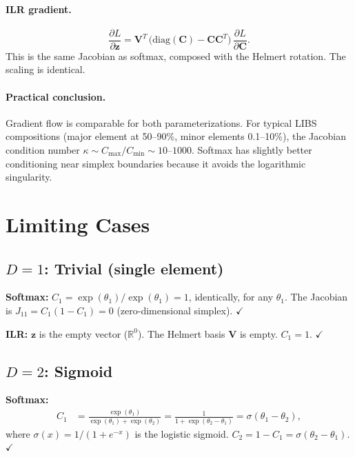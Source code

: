 \documentclass[11pt]{article}
\newcommand{\CC}{\mathbf{C}}
\newcommand{\zz}{\mathbf{z}}
\newcommand{\VV}{\mathbf{V}}
\begin{document}
\paragraph{ILR gradient.}
%
\begin{equation}
  \frac{\partial L}{\partial \zz}
  = \VV^T\,\bigl(\mathrm{diag}(\CC) - \CC\CC^T\bigr)\,
    \frac{\partial L}{\partial \CC}.
  \label{eq:ilr-gradient}
\end{equation}
%
This is the same Jacobian as softmax, composed with the Helmert rotation.
The scaling is identical.

\paragraph{Practical conclusion.}
Gradient flow is comparable for both parameterizations.  For typical
LIBS compositions (major element at 50--90\%, minor elements 0.1--10\%),
the Jacobian condition number $\kappa \sim C_\mathrm{max}/C_\mathrm{min}
\sim 10$--$1000$.  Softmax has slightly better conditioning near simplex
boundaries because it avoids the logarithmic singularity.


\section{Limiting Cases}
\label{sec:limits}

\subsection{$D = 1$: Trivial (single element)}

\textbf{Softmax:}
$C_1 = \exp(\theta_1)/\exp(\theta_1) = 1$, identically, for any
$\theta_1$.  The Jacobian is $J_{11} = C_1(1 - C_1) = 0$
(zero-dimensional simplex). $\checkmark$

\textbf{ILR:}
$\zz$ is the empty vector ($\mathbb{R}^0$).  The Helmert basis $\VV$
is empty.  $C_1 = 1$.  $\checkmark$

\subsection{$D = 2$: Sigmoid}

\textbf{Softmax:}
%
\begin{align}
  C_1 &= \frac{\exp(\theta_1)}{\exp(\theta_1) + \exp(\theta_2)}
       = \frac{1}{1 + \exp(\theta_2 - \theta_1)}
       = \sigma(\theta_1 - \theta_2),
  \label{eq:sigmoid}
\end{align}
%
where $\sigma(x) = 1/(1+e^{-x})$ is the logistic sigmoid.
$C_2 = 1 - C_1 = \sigma(\theta_2 - \theta_1)$. $\checkmark$
\end{document}
